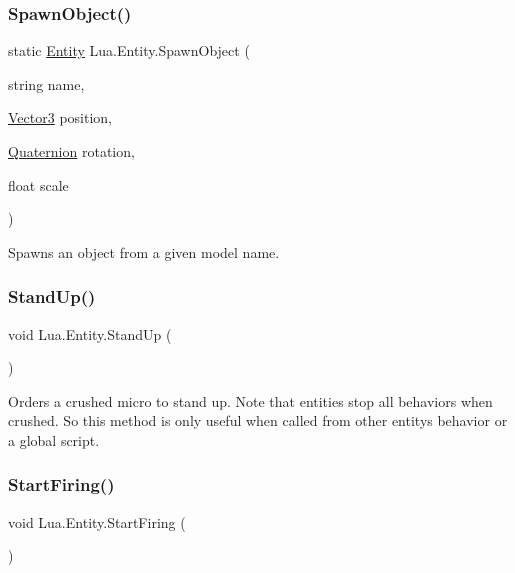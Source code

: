 \subsubsection{\texorpdfstring{SpawnObject()}{SpawnObject()}}
{\footnotesize\ttfamily static \mbox{\hyperlink{class_lua_1_1_entity}{Entity}} Lua.\+Entity.\+Spawn\+Object (\begin{DoxyParamCaption}\item[{string}]{name,  }\item[{\mbox{\hyperlink{class_lua_1_1_vector3}{Vector3}}}]{position,  }\item[{\mbox{\hyperlink{class_lua_1_1_quaternion}{Quaternion}}}]{rotation,  }\item[{float}]{scale }\end{DoxyParamCaption})\hspace{0.3cm}{\ttfamily [static]}}



Spawns an object from a given model name. 

\mbox{\label{class_lua_1_1_entity_af93c20b6cca387d60a5368c079ae65ef}} 
\subsubsection{\texorpdfstring{StandUp()}{StandUp()}}
{\footnotesize\ttfamily void Lua.\+Entity.\+Stand\+Up (\begin{DoxyParamCaption}{ }\end{DoxyParamCaption})}



Orders a crushed micro to stand up. Note that entities stop all behaviors when crushed. So this method is only useful when called from other entity\textquotesingle{}s behavior or a global script. 

\mbox{\label{class_lua_1_1_entity_a3a5c197d31f8834f8ed67f71c6157719}} 
\subsubsection{\texorpdfstring{StartFiring()}{StartFiring()}}
{\footnotesize\ttfamily void Lua.\+Entity.\+Start\+Firing (\begin{DoxyParamCaption}{ }\end{DoxyParamCaption})}



